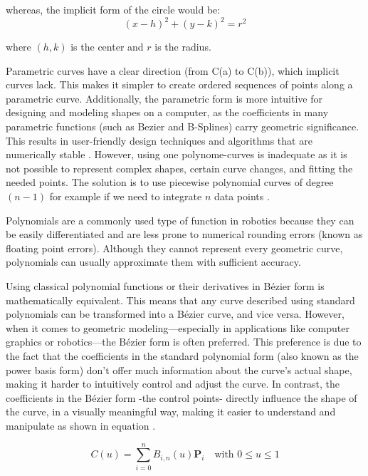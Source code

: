 whereas, the implicit form of the circle would be:
\begin{equation}
    (x - h)^2 + (y - k)^2 = r^2
\end{equation}

where \((h,k)\) is the center and \(r\) is the radius.


Parametric curves have a clear direction (from C(a) to C(b)), which implicit curves lack. This makes 
it simpler to create ordered sequences of points along a parametric curve. Additionally, the parametric 
form is more intuitive for designing and modeling shapes on a computer, as the coefficients in many 
parametric functions (such as Bezier and B-Splines) carry geometric significance. This results in 
user-friendly design techniques and algorithms that are numerically stable \cite{R28}. 
However, using one polynome-curves is inadequate as it is not possible to represent complex shapes, certain 
curve changes, and fitting the needed points. 
The solution is to use piecewise polynomial curves of degree \((n-1)\) for example if we need to integrate
\(n\) data points \cite{R29}.

Polynomials are a commonly used type of function in robotics because they can be easily differentiated 
and are less prone to numerical rounding errors (known as floating point errors). Although they cannot 
represent every geometric curve, polynomials can usually approximate them with sufficient accuracy. 

Using classical polynomial functions or their derivatives in Bézier form is mathematically equivalent. 
This means that any curve described using standard polynomials can be transformed into a Bézier curve, 
and vice versa. However, when it comes to geometric modeling—especially in applications like computer 
graphics or robotics—the Bézier form is often preferred. This preference is due to the fact that the 
coefficients in the standard polynomial form (also known as the power basis form) don't offer much 
information about the curve's actual shape, making it harder to intuitively control and adjust the 
curve. In contrast, the coefficients in the Bézier form -the control points- directly influence the 
shape of the curve, in a visually meaningful way, making it easier to understand and manipulate 
as shown in equation  \cite{R28}. 

\begin{equation}
    C(u) = \sum_{i=0}^{n} B_{i,n}(u) \mathbf{P}_i \quad \text{with } 0 \leq u \leq 1 \label{Bezier curve}
\end{equation}

